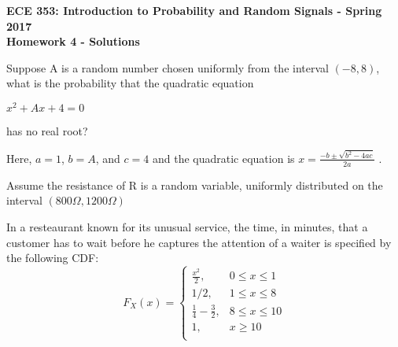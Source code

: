 \documentclass[10pt]{exam}
\begin{document}
\begin{center}
\bfseries
    ECE 353: Introduction to Probability and Random Signals - Spring 2017\\
    Homework 4  - Solutions\\
\end{center}

\begin{questions}


\question Suppose A is a random number chosen uniformly from the interval $(-8,8)$, what is the probability that the quadratic equation
    
\begin{center}
$x^2+Ax+4=0$
\end{center}
has no real root?

Here, $a=1$, $b=A$, and $c=4$ and the quadratic equation is $x=\frac{-b\pm \sqrt{b^2-4ac}}{2a}$ .

\question Assume the resistance of R is a random variable, uniformly distributed on the interval $(800\Omega , 1200\Omega )$

 
\question In a resteaurant known for its unusual service, the time, in minutes, that a customer has to wait before he captures the attention of a waiter is specified by the following CDF:
\[ F_X(x) =
    \begin{cases}
    \frac{x^2}{2},           & 0 \leq x \leq 1 \\
    1/2,                     & 1 \leq x \leq 8 \\
    \frac{1}{4}-\frac{3}{2}, & 8 \leq x \leq 10 \\
    1,                       & x \geq 10 \\
    \end{cases}
\]
 

\end{questions}
\end{document}

